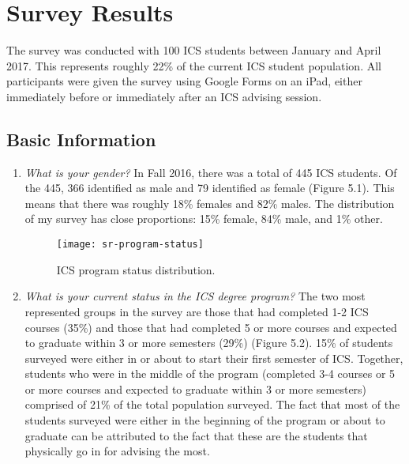 \chapter{Survey Results}
\label{survey-results}

The survey was conducted with 100 ICS students between January and April 2017. This represents roughly 22\% of the current ICS student population. All participants were given the survey using Google Forms on an iPad, either immediately before or immediately after an ICS advising session. 
\section{Basic Information}
\begin{enumerate}
\begin{figure}[h]
\centering
\texttt{[image: sr-gender]}
\caption{Gender distribution.}
\end{figure}
\item \textit{What is your gender?}
In Fall 2016, there was a total of 445 ICS students. Of the 445, 366 identified as male and 79 identified as female (Figure 5.1). This means that there was roughly 18\% females and 82\% males. The distribution of my survey has close proportions: 15\% female, 84\% male, and 1\% other. 
\begin{figure}[h]
\centering
\texttt{[image: sr-program-status]}
\caption{ICS program status distribution.}
\end{figure}
\item \textit{What is your current status in the ICS degree program?}
The two most represented groups in the survey are those that had completed 1-2 ICS courses (35\%) and those that had completed 5 or more courses and expected to graduate within 3 or more semesters (29\%) (Figure 5.2). 15\% of students surveyed were either in or about to start their first semester of ICS. Together, students who were in the middle of the program (completed 3-4 courses or 5 or more courses and expected to graduate within 3 or more semesters) comprised of 21\% of the total population surveyed. The fact that most of the students surveyed were either in the beginning of the program or about to graduate can be attributed to the fact that these are the students that physically go in for advising the most. 
\end{enumerate}

